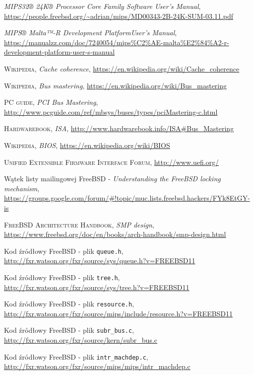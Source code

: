 \documentclass[shortabstract,inz]{iithesis}
\begin{document}
\begin{thebibliography}{1}
 \textit{MIPS32® 24K® Processor Core Family Software User’s Manual}, 
\url{https://people.freebsd.org/~adrian/mips/MD00343-2B-24K-SUM-03.11.pdf}

 \textit{MIPS® Malta™-R Development PlatformUser’s Manual}, 
\url{https://manualzz.com/doc/7240054/mips%C2%AE-malta%E2%84%A2-r-development-platform-user-s-manual}

 \textsc{Wikipedia}, \textit{Cache coherence},
\url{https://en.wikipedia.org/wiki/Cache_coherence}

 \textsc{Wikipedia}, \textit{Bus mastering},
\url{https://en.wikipedia.org/wiki/Bus_mastering}

 \textsc{PC guide}, \textit{PCI Bus Mastering},
\url{http://www.pcguide.com/ref/mbsys/buses/types/pciMastering-c.html}

 \textsc{Hardwarebook}, \textit{ISA},
\url{http://www.hardwarebook.info/ISA#Bus_Mastering}

 \textsc{Wikipedia}, \textit{BIOS},
\url{https://en.wikipedia.org/wiki/BIOS}

 \textsc{Unified Extensible Firmware Interface Forum},
\url{http://www.uefi.org/}

 Wątek listy mailingowej FreeBSD - \textit{Understanding the FreeBSD locking mechanism},
\url{https://groups.google.com/forum/#!topic/muc.lists.freebsd.hackers/FYk8EtGY-is}

 \textsc{FreeBSD Architecture Handbook},
\textit{SMP design},
\url{https://www.freebsd.org/doc/en/books/arch-handbook/smp-design.html}

 Kod źródłowy FreeBSD - plik \texttt{queue.h},
\url{http://fxr.watson.org/fxr/source/sys/queue.h?v=FREEBSD11}

 Kod źródłowy FreeBSD - plik \texttt{tree.h},
\url{http://fxr.watson.org/fxr/source/sys/tree.h?v=FREEBSD11}

 Kod źródłowy FreeBSD - plik \texttt{resource.h},
\url{http://fxr.watson.org/fxr/source/mips/include/resource.h?v=FREEBSD11}

 Kod źródłowy FreeBSD - plik \texttt{subr\_bus.c},
\url{http://fxr.watson.org/fxr/source/kern/subr_bus.c}

 Kod źródłowy FreeBSD - plik \texttt{intr\_machdep.c},
\url{http://fxr.watson.org/fxr/source/mips/mips/intr_machdep.c}


\end{thebibliography}
\end{document}
